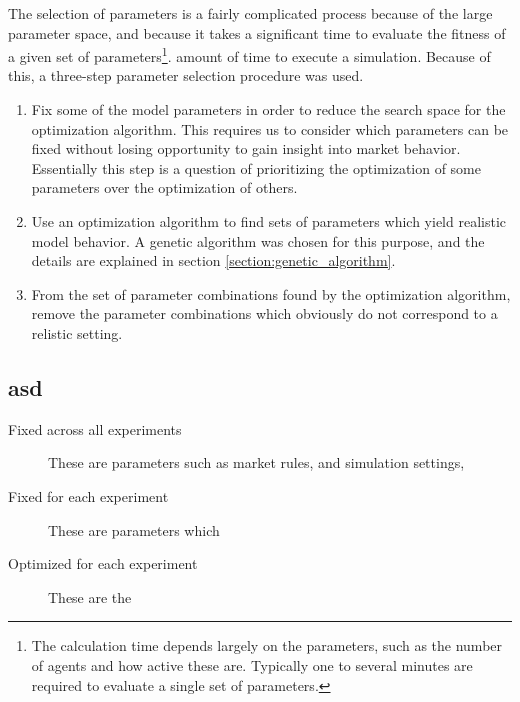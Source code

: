 The selection of parameters is a fairly complicated process because of the large parameter space, and because it takes a significant time to evaluate the fitness of a given set of parameters\footnote{The calculation time depends largely on the parameters, such as the number of agents and how active these are. Typically one to several minutes are required to evaluate a single set of parameters.}. amount of time to execute a simulation. Because of this, a three-step parameter selection procedure was used.
\begin{enumerate}
\item Fix some of the model parameters in order to reduce the search space for the optimization algorithm. This requires us to consider which parameters can be fixed without losing opportunity to gain insight into market behavior. Essentially this step is a question of prioritizing the optimization of some parameters over the optimization of others. 
\item Use an optimization algorithm to find sets of parameters which yield realistic model behavior. A genetic algorithm was chosen for this purpose, and the details are explained in section \ref{section:genetic_algorithm}.
\item From the set of parameter combinations found by the optimization algorithm, remove the parameter combinations which obviously do not correspond to a relistic setting.
\end{enumerate}


\subsection{asd}
\begin{description}
\item[Fixed across all experiments] These are parameters such as market rules, and simulation settings, 
\item[Fixed for each experiment] These are parameters which 
\item[Optimized for each experiment] These are the 
\end{description}


